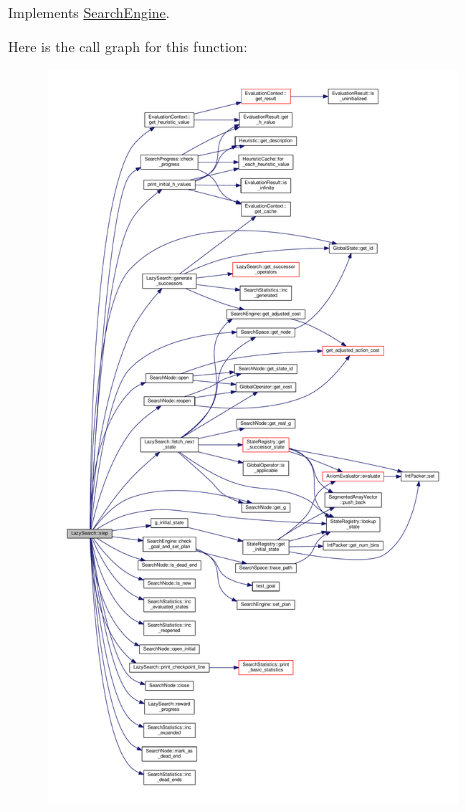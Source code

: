 Implements \hyperlink{classSearchEngine_a2c003ac4636fd1442fd2d4eb8db5ab8d}{Search\-Engine}.



Here is the call graph for this function\-:
\nopagebreak
\begin{figure}[H]
\begin{center}
\leavevmode
\includegraphics[height=550pt]{classLazySearch_a58d840359308153dab0d7c7f39be10bd_cgraph}
\end{center}
\end{figure}




